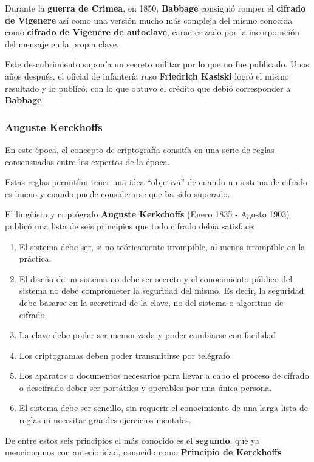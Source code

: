 \documentclass[nochap]{apuntesURJC}
\begin{document}
Durante la \textbf{guerra de Crimea}, en 1850, \textbf{Babbage} consiguió romper el \textbf{cifrado de Vigenere} así como una versión mucho más compleja del mismo conocida como \textbf{cifrado de Vigenere de autoclave}, caracterizado por la incorporación del mensaje en la propia clave.

Este descubrimiento suponía un secreto militar por lo que no fue publicado. Unos años después, el oficial de infantería ruso \textbf{Friedrich Kasiski} logró el mismo resultado y lo publicó, con lo que obtuvo el crédito que debió corresponder a \textbf{Babbage}.

\subsubsection{Auguste Kerckhoffs}
En este época, el concepto de criptografía consitía en una serie de reglas consensuadas entre los expertos de la época.

Estas reglas permitían tener una idea ``objetiva'' de cuando un sistema de cifrado es bueno y cuando puede considerarse que ha sido superado.

El lingüista y criptógrafo \textbf{Auguste Kerkchoffs} (Enero 1835 - Agosto 1903) publicó una lista de seis principios que todo cifrado debía satisface:
\begin{enumerate}
\item El sistema debe ser, si no teóricamente irrompible, al menos irrompible en la práctica.
\item El diseño de un sistema no debe ser secreto y el conocimiento público del sistema no debe comprometer la seguridad del mismo. Es decir, la seguridad debe basarse en la secretitud de la clave, no del sistema o algoritmo de cifrado.
\item La clave debe poder ser memorizada y poder cambiarse con facilidad
\item Los criptogramas deben poder transmitirse por telégrafo
\item Los aparatos o documentos necesarios para llevar a cabo el proceso de cifrado o descifrado deber ser portátiles y operables por una única persona.
\item El sistema debe ser sencillo, sin requerir el conocimiento de una larga lista de reglas ni necesitar grandes ejercicios mentales.
\end{enumerate}

De entre estos seis principios el más conocido es el \textbf{segundo}, que ya mencionamos con anterioridad, conocido como \textbf{Principio de Kerckhoffs}
\end{document}
